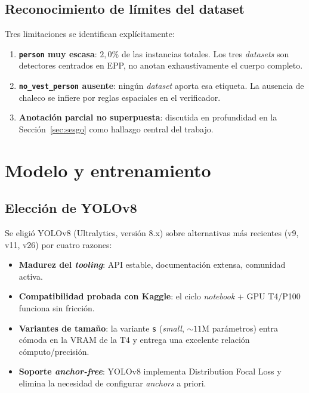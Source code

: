 \documentclass[journal,onecolumn,11pt]{IEEEtran}
\begin{document}
\subsection{Reconocimiento de límites del dataset}

Tres limitaciones se identifican explícitamente:

\begin{enumerate}[leftmargin=*]
    \item \textbf{\texttt{person} muy escasa}: $2{,}0\%$ de las
    instancias totales. Los tres \textit{datasets} son detectores
    centrados en EPP, no anotan exhaustivamente el cuerpo completo.
    \item \textbf{\texttt{no\_vest\_person} ausente}: ningún
    \textit{dataset} aporta esa etiqueta. La ausencia de chaleco se
    infiere por reglas espaciales en el verificador.
    \item \textbf{Anotación parcial no superpuesta}: discutida en
    profundidad en la Sección~\ref{sec:sesgo} como hallazgo central
    del trabajo.
\end{enumerate}

\section{Modelo y entrenamiento}

\subsection{Elección de YOLOv8}

Se eligió YOLOv8 \cite{ultralytics2023} (Ultralytics, versión 8.x)
sobre alternativas más recientes (v9, v11, v26) por cuatro razones:

\begin{itemize}[leftmargin=*]
    \item \textbf{Madurez del \textit{tooling}}: API estable,
    documentación extensa, comunidad activa.
    \item \textbf{Compatibilidad probada con Kaggle}: el ciclo
    \textit{notebook} + GPU T4/P100 funciona sin fricción.
    \item \textbf{Variantes de tamaño}: la variante \texttt{s}
    (\textit{small}, $\sim 11$M parámetros) entra cómoda en la VRAM
    de la T4 y entrega una excelente relación cómputo/precisión.
    \item \textbf{Soporte \textit{anchor-free}}: YOLOv8 implementa
    Distribution Focal Loss y elimina la necesidad de configurar
    \textit{anchors} a priori.
\end{itemize}
\end{document}
